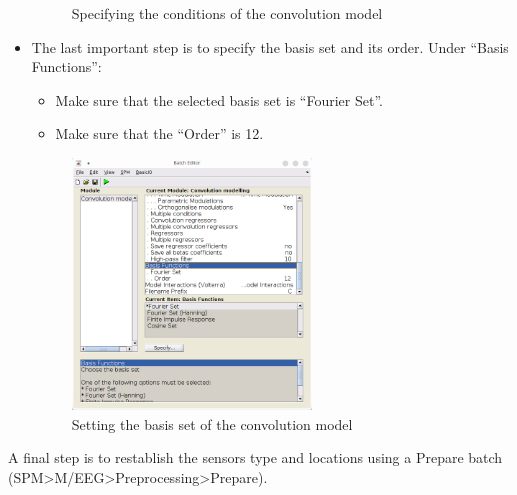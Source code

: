 \begin{itemize}
\begin{figure}[htb]
			 	\caption{Specifying the conditions of the convolution model}
			 	\label{fig:meeg-firstlevel:artefacts-options}
			 \end{figure}
			\item The last important step is to specify the basis set and its order. Under ``Basis Functions'':
			\begin{itemize}
				\item Make sure that the selected basis set is ``Fourier Set''. 
				\item Make sure that the ``Order'' is 12. 
			\end{itemize}
			\begin{figure}[htb]
			 	\centering
			 	\includegraphics[width=0.6\textwidth]{meeg_firstlevel/figures/conv-basis-set.png}
			 	\caption{Setting the basis set of the convolution model}
			 	\label{fig:meeg-firstlevel:artefacts-options}
			 \end{figure}
		\end{itemize}
		A final step is to restablish the sensors type and locations using a Prepare batch (SPM>M/EEG>Preprocessing>Prepare). 
